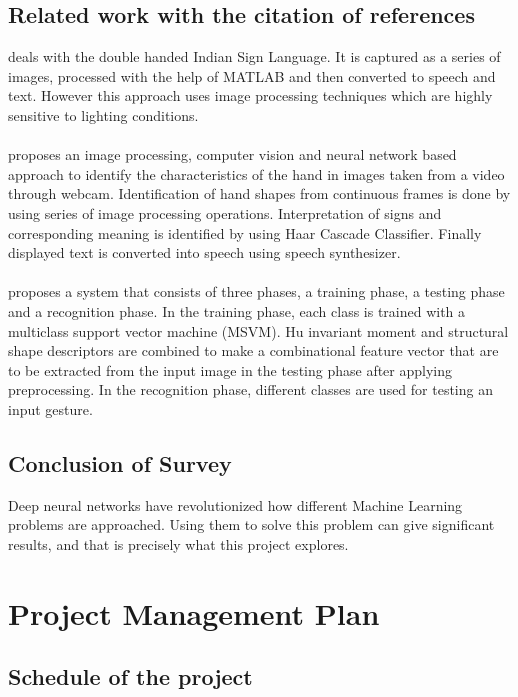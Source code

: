 \documentclass[12pt,oneside,a4paper]{article}
\begin{document}
		\subsection{Related work with the citation of references}
			\cite{dutta:2015} deals with the double handed Indian Sign Language. It is captured as a series of images, processed with the help of MATLAB and then converted to speech and text. However this approach uses image processing techniques which are highly sensitive to lighting conditions. \\
			\\
			\cite{DK:2014} proposes an image processing, computer vision and neural network based approach to identify the characteristics of the hand in images taken from a video through webcam. Identification of hand shapes from continuous frames is done by using series of image processing operations. Interpretation of signs and corresponding meaning is identified by using Haar Cascade Classifier. Finally displayed text is converted into speech using speech synthesizer. \\
			\\
			\cite{autoisl:2013} proposes a system that consists of three phases, a training phase, a testing phase and a recognition phase. In the training phase, each class is trained with a multiclass support vector machine (MSVM). Hu invariant moment and structural shape descriptors are combined to make a combinational feature vector that are to be extracted from the input image in the testing phase after applying preprocessing. In the recognition phase, different classes are used for testing an input gesture.

		\subsection{Conclusion of Survey}
			Deep neural networks have revolutionized how different Machine Learning problems are approached. Using them to solve this problem can give significant results, and that is precisely what this project explores.

	\section{Project Management Plan}

		\subsection{Schedule of the project}
\end{document}
